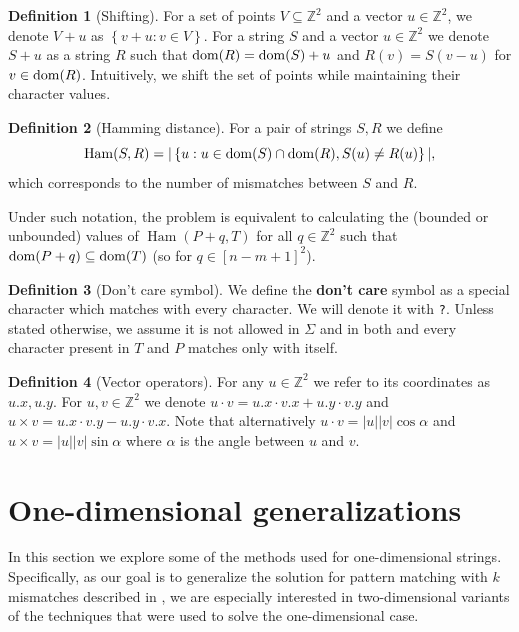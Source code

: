 \documentclass[11pt]{article}
\newcommand{\Z}{\mathbb{Z}}
\renewcommand{\phi}{\varphi}
\newcommand{\set}[1]{\left\lbrace #1 \right\rbrace}
\theoremstyle{plain}
\theoremstyle{definition}
\newtheorem{definition}{Definition}
\theoremstyle{remark}
\DeclareMathOperator*{\Ham}{Ham}
\begin{document}
\begin{definition}[Shifting]
	For a set of points $V \subseteq \Z^2$ and a vector $u \in \Z^2$, we denote $V + u$ as $\set{v + u : v \in V}$.
	For a string $S$ and a vector $u \in \Z^2$ we denote $S + u$ as a string $R$ such that
	$\operatorname*{dom}(R) = \operatorname*{dom}(S) + u$ and $R(v) = S(v - u)$ for $v \in \operatorname*{dom}(R)$.
	Intuitively, we shift the set of points while maintaining their character values.
\end{definition}

\begin{definition}[Hamming distance]
	For a pair of strings $S, R$ we define
	\[ \Ham(S, R) = |\set{u : u \in \d{S} \cap \d{R}, S(u) \neq R(u)}|,\]
	which corresponds to the number of mismatches between $S$ and $R$.
\end{definition}

Under such notation, the \HD problem is equivalent to calculating the (bounded or unbounded) values of $ \Ham(P + q, T) $
for all $q \in \Z^2$ such that $\operatorname*{dom}(P + q) \subseteq \operatorname*{dom}(T)$ (so for $q \in [n - m + 1]^2$).

\begin{definition}[Don't care symbol]
	We define the \textbf{don't care} symbol as a special character which matches with every character.
	We will denote it with \texttt{?}.
	Unless stated otherwise, we assume it is not allowed in $\Sigma$ and in both \hd and \HD every character present in $T$ and $P$ matches only with itself.
\end{definition}

\newcommand{\x}[1]{#1.x}
\newcommand{\y}[1]{#1.y}
\newcommand{\h}[1]{\phi \times #1}
\newcommand{\s}[1]{\psi \times #1}
\begin{definition}[Vector operators]
	For any $u \in \Z^2$ we refer to its coordinates as $\x{u}, \y{u}$.
	For $u, v \in \Z^2$ we denote $u \cdot v = \x{u} \cdot \x{v} + \y{u} \cdot \y{v}$
	and $u \times v = \x{u} \cdot \y{v} - \y{u} \cdot \x{v}$.
	Note that alternatively $u \cdot v = |u||v| \cos \alpha$ and $u \times v = |u||v| \sin \alpha$ where $\alpha$ is the angle between $u$ and $v$.
\end{definition}


\section{One-dimensional generalizations}

In this section we explore some of the methods used for one-dimensional strings.
Specifically, as our goal is to generalize the solution for pattern matching with $k$ mismatches described in \cite{Gawrychowski2017}, we are especially interested in two-dimensional variants of the techniques that were used to solve the one-dimensional case.
\end{document}

